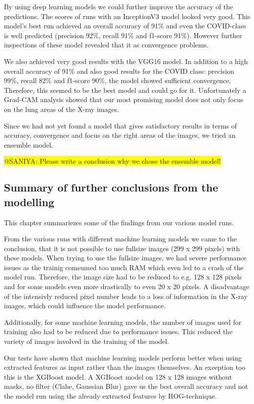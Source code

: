 \documentclass{article}
\begin{document}
By using deep learning models we could further improve the accuracy of the predictions. The scores of runs with an InceptionV3 model looked very good. This model's best run achieved an overall accuracy of 91\% and even the COVID-class is well predicted (precision 92\%, recall 91\% and f1-score 91\%). However further inspections of these model revealed that it as convergence problems. 

We also achieved very good results with the VGG16 model. In addition to a high overall accuracy of 91\% and also good results for the COVID class: precision 99\%, recall 82\% and f1-score 90\%, the model showed sufficient convergence. Therefore, this seemed to be the best model and could go for it. Unfortunately a Grad-CAM analysis showed that our most promising model does not only focus on the lung areas of the X-ray images. 

Since we had not yet found a model that gives satisfactory results in terms of accuracy, convergence and focus on the right areas of the images, we tried an ensemble model. 

\colorbox{yellow}{@SANIYA: Please write a conclusion why we chose the ensemble model!}


\subsection{Summary of further conclusions from the modelling}
This chapter summariezes some of the findings from our various model runs. 

From the various runs with different machine learning models we came to the conclusion, that it is not possible to use fullsize images (299 x 299 pixels) with these models. 
When trying to use the fullsize images, we had severe performance issues as the trainig comsumed too much RAM which even led to a crash of the model run. Therefore, the image size had to be reduced to e.g. 128 x 128 pixels and for some models even more drastically to even 20 x 20 pixels. A disadvantage of the intensivly reduced pixel number leads to a loss of information in the X-ray images, which could influence the model performance. 

Additionally, for some machine learning models, the number of images used for training also had to be reduced due to performance issues. This reduced the variety of images involved in the training of the model. 

Our tests have shown that machine learning models perform better when using extracted features as input rather than the images themselves. An exception too this is the XGBoost model. A XGBoost model on 128 x 128 images without masks, no filter (Clahe, Gaussian Blur) gave us the best overall accuracy and not the model run using the already extracted features by HOG-technique. 
\end{document}
